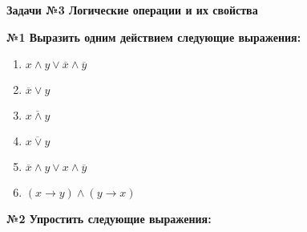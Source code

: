 \usepackage{stmaryrd}%




    \begin{center}
        \textbf{Задачи №3 Логические операции и их свойства}\\
    \end{center}

    \begin{center}
        \textbf{№1 Выразить одним действием следующие выражения:}
    \end{center}

    \begin{minipage}[t]{0.4\textwidth}
        \begin{enumerate}
            \item $x \wedge y \vee \overline x \wedge \overline y$
            \item $\overline x \vee y$
            \item $\overline{x \wedge y}$
        \end{enumerate}
    \end{minipage}
    \begin{minipage}[t]{0.4\textwidth}
        \begin{enumerate}
            \setcounter{enumi}{3}
            \item $\overline{x \vee y}$
            \item $\overline x \wedge y \vee x \wedge \overline y$
            \item $(x \rightarrow y) \wedge (y \rightarrow x)$
        \end{enumerate}
    \end{minipage}


    \begin{center}
        \textbf{№2 Упростить следующие выражения:}
    \end{center}

